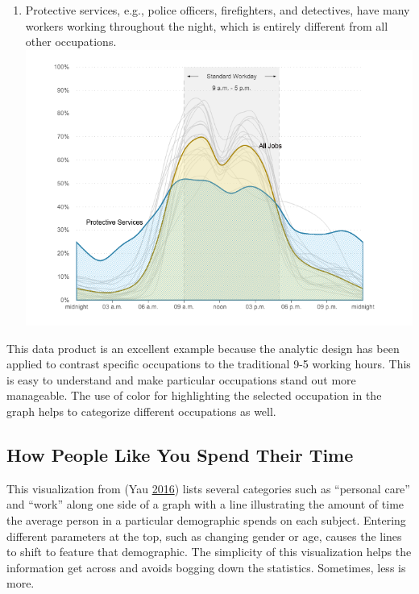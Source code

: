 \documentclass[]{book}
\providecommand{\tightlist}{%
  \setlength{\itemsep}{0pt}\setlength{\parskip}{0pt}}
\theoremstyle{definition}
\theoremstyle{definition}
\theoremstyle{definition}
\theoremstyle{remark}
\begin{document}
\begin{enumerate}
\def\labelenumi{\arabic{enumi}.}
\setcounter{enumi}{2}
\tightlist
\item
  Protective services, e.g., police officers, firefighters, and
  detectives, have many workers working throughout the night, which is
  entirely different from all other occupations.
  \includegraphics{images/protective.png}
\end{enumerate}

This data product is an excellent example because the analytic design
has been applied to contrast specific occupations to the traditional 9-5
working hours. This is easy to understand and make particular
occupations stand out more manageable. The use of color for highlighting
the selected occupation in the graph helps to categorize different
occupations as well.

\subsection{How People Like You Spend Their
Time}\label{how-people-like-you-spend-their-time}

This visualization from (Yau \protect\hyperlink{ref-spendingtime}{2016})
lists several categories such as ``personal care'' and ``work'' along
one side of a graph with a line illustrating the amount of time the
average person in a particular demographic spends on each subject.
Entering different parameters at the top, such as changing gender or
age, causes the lines to shift to feature that demographic. The
simplicity of this visualization helps the information get across and
avoids bogging down the statistics. Sometimes, less is more.
\end{document}
